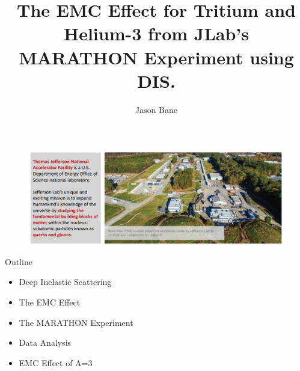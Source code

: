 \documentclass[12pt,usenames,dvipsnames]{beamer}
\title[EMC A=3]{The EMC Effect for Tritium and Helium-3 from JLab's MARATHON Experiment using DIS.} %
\author{Jason Bane} %
\institute[UTK] %
{
University of Tennessee \\ %
\medskip
\textit{jbane1@vols.utk.edu} %
}
\date{} %
\begin{document}
\begin{frame}
	\titlepage %
\end{frame}

\begin{frame}
\begin{figure}
	\includegraphics[width=12cm]{../images/Jlab1.png}
\end{figure}
\end{frame}
\begin{frame}{Outline}
\large{
\begin{itemize}
	\item Deep Inelastic Scattering
	\item The EMC Effect
	\item The MARATHON Experiment
	\item Data Analysis
	\item EMC Effect of A=3
\end{itemize} 
}


\end{frame}
\end{document}
